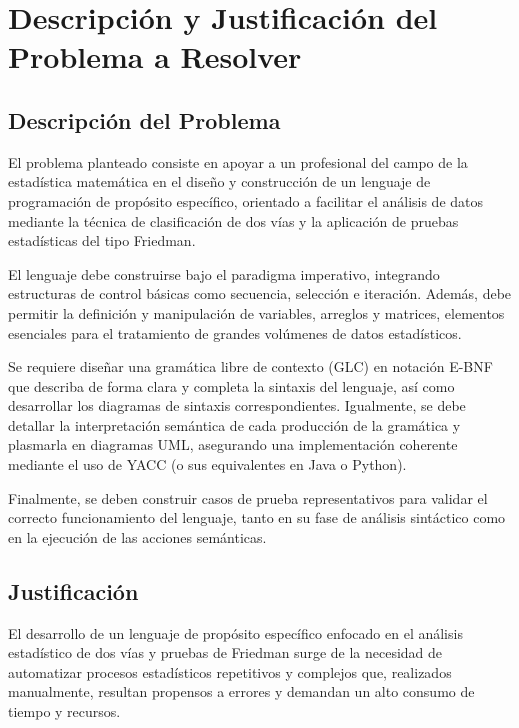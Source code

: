 \documentclass{article}
\begin{document}

\section{Descripción y Justificación del Problema a Resolver}\label{sec:descr}

\subsection*{Descripción del Problema}

El problema planteado consiste en apoyar a un profesional del campo de la estadística matemática en el diseño y construcción de un lenguaje de programación de propósito específico, orientado a facilitar el análisis de datos mediante la técnica de clasificación de dos vías y la aplicación de pruebas estadísticas del tipo Friedman. 

El lenguaje debe construirse bajo el paradigma imperativo, integrando estructuras de control básicas como secuencia, selección e iteración. Además, debe permitir la definición y manipulación de variables, arreglos y matrices, elementos esenciales para el tratamiento de grandes volúmenes de datos estadísticos. 

Se requiere diseñar una gramática libre de contexto (GLC) en notación E-BNF que describa de forma clara y completa la sintaxis del lenguaje, así como desarrollar los diagramas de sintaxis correspondientes. Igualmente, se debe detallar la interpretación semántica de cada producción de la gramática y plasmarla en diagramas UML, asegurando una implementación coherente mediante el uso de YACC (o sus equivalentes en Java o Python).  

Finalmente, se deben construir casos de prueba representativos para validar el correcto funcionamiento del lenguaje, tanto en su fase de análisis sintáctico como en la ejecución de las acciones semánticas.

\subsection*{Justificación}

El desarrollo de un lenguaje de propósito específico enfocado en el análisis estadístico de dos vías y pruebas de Friedman surge de la necesidad de automatizar procesos estadísticos repetitivos y complejos que, realizados manualmente, resultan propensos a errores y demandan un alto consumo de tiempo y recursos.
\end{document}
